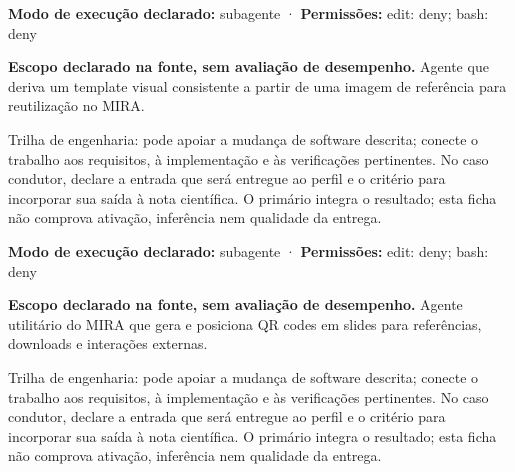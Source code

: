 \begin{arquitetura}
\textbf{Modo de execução declarado:} subagente · \textbf{Permissões:} edit: deny; bash: deny
\end{arquitetura}


\begin{descricao}
\textbf{Escopo declarado na fonte, sem avaliação de desempenho.}
Agente que deriva um template visual consistente a partir de uma imagem de referência para reutilização no MIRA.
\end{descricao}

\begin{funcao}
Trilha de engenharia: pode apoiar a mudança de software descrita; conecte o trabalho aos requisitos, à implementação e às verificações pertinentes. No caso condutor, declare a entrada que será entregue ao perfil e o critério para incorporar sua saída à nota científica. O primário integra o resultado; esta ficha não comprova ativação, inferência nem qualidade da entrega.
\end{funcao}

\begin{arquitetura}
\textbf{Modo de execução declarado:} subagente · \textbf{Permissões:} edit: deny; bash: deny
\end{arquitetura}


\begin{descricao}
\textbf{Escopo declarado na fonte, sem avaliação de desempenho.}
Agente utilitário do MIRA que gera e posiciona QR codes em slides para referências, downloads e interações externas.
\end{descricao}

\begin{funcao}
Trilha de engenharia: pode apoiar a mudança de software descrita; conecte o trabalho aos requisitos, à implementação e às verificações pertinentes. No caso condutor, declare a entrada que será entregue ao perfil e o critério para incorporar sua saída à nota científica. O primário integra o resultado; esta ficha não comprova ativação, inferência nem qualidade da entrega.
\end{funcao}


